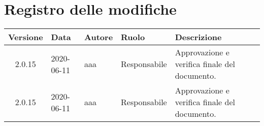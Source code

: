 \section*{Registro delle modifiche}
\setcounter{table}{-1}
{


\centering
\renewcommand{\arraystretch}{1.5}
\begin{longtable}{c C{2.5cm} C{2.5cm} C{3.5cm} C{3.5cm}}
\textbf{Versione} &
\textbf{Data}&
\textbf{Autore}&
\textbf{Ruolo}&
\textbf{Descrizione}\\
\endhead

2.0.15 & 2020-06-11 & aaa & Responsabile & Approvazione e verifica finale del documento. \\
2.0.15 & 2020-06-11 & aaa & Responsabile & Approvazione e verifica finale del documento. \\
		
\end{longtable}
}